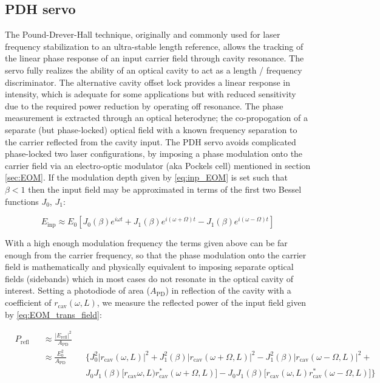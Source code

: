 \subsection{PDH servo}\label{subsubsec:pdh}
The Pound-Drever-Hall technique, originally and commonly used for laser frequency stabilization to an ultra-stable length reference, allows the tracking of the linear phase response of an input carrier field through cavity resonance. The servo fully realizes the ability of an optical cavity to act as a length / frequency discriminator. The alternative cavity offset lock provides a linear response in intensity, which is adequate for some applications but with reduced sensitivity due to the required power reduction by operating off resonance.
The phase measurement is extracted through an optical heterodyne; the co-propogation of a separate (but phase-locked) optical field with a known frequency separation to the carrier reflected from the cavity input. The PDH servo avoids complicated phase-locked two laser configurations, by imposing a phase modulation onto the carrier field via an electro-optic modulator (aka Pockels cell) mentioned in section \ref{sec:EOM}. If the modulation depth given by \ref{eq:inp_EOM} is set such that $\beta < 1$ then the input field may be approximated in terms of the first two Bessel functions $J_0$, $J_1$:

\begin{equation} \label{eq:EOM_trans_field}
E_\mathrm{inp} \approx E_0 [J_0(\beta)e^{i \omega t} + J_1(\beta)e^{i (\omega + \Omega) t} - J_1(\beta)e^{i(\omega -\Omega)t}]
\end{equation}

With a high enough modulation frequency the terms given above can be far enough from the carrier frequency, so that the phase modulation onto the carrier field is mathematically and physically equivalent to imposing separate optical fields (sidebands) which in most cases do not resonate in the optical cavity of interest. Setting a photodiode of area ($A_\mathrm{PD}$) in reflection of the cavity with a coefficient of $r_\mathrm{cav}(\omega,L)$, we measure the reflected power of the input field given by \ref{eq:EOM_trans_field}:

\begin{equation}
 \begin{alignedat}{3}
    &P_\mathrm{refl} && \approx \frac{|E_\mathrm{refl}|^2}{A_\mathrm{PD}} && \\
    & &&\approx \frac{E_0^2}{A_\mathrm{PD}} && \bigg\{J_0^2 |r_\mathrm{cav}(\omega,L)|^2 + J_1^2(\beta)|r_\mathrm{cav}(\omega+\Omega,L)|^2 - J_1^2(\beta)|r_\mathrm{cav}(\omega-\Omega,L)|^2 +  \\
    & && && J_0J_1(\beta)\big[r_\mathrm{cav}\omega,L) r_\mathrm{cav}^*(\omega+\Omega,L)\big] - J_ 0J_1(\beta)\big[r_\mathrm{cav}(\omega,L)r_\mathrm{cav}^*(\omega-\Omega,L)\big]\bigg\}
  \end{alignedat}
\end{equation}

